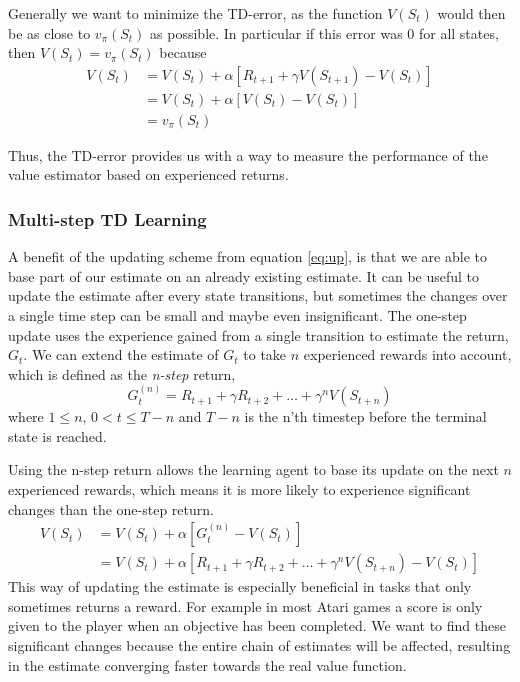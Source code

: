 \documentclass[11pt]{article}
\begin{document}
Generally we want to minimize the TD-error, as the function $V(S_t)$
would then be as close to $v_\pi(S_t)$ as possible.
In particular if this error was 0 for all states, then
$V(S_t) = v_\pi(S_t)$ because 
\begin{equation}
    \begin{aligned}
    V(S_t)  & = V(S_t) + \alpha  [R_{t+1} + \gamma  V(S_{t+1}) - V(S_t)]   \\
           & = V(S_t) + \alpha  [V(S_t) - V(S_t)]  \\
           & = v_\pi(S_t) 
    \end{aligned}
\end{equation}

Thus, the TD-error provides us with a way to measure the performance of
the value estimator based on experienced returns.

\subsubsection{Multi-step TD Learning}\label{sec:multi}

A benefit of the updating scheme from equation \ref{eq:up}, is that we are able to base
part of our estimate on an already existing estimate.
It can be useful to update the estimate after every state transitions, but sometimes
the changes over a single time step can be small and maybe even insignificant.
The one-step update uses the experience gained from a single transition to
estimate the return, $G_t$.
We can extend the estimate of $G_t$ to take $n$ experienced rewards
into account, which is defined as the \textit{n-step} return,
\begin{equation}
    G^{(n)}_t = R_{t+1} + \gamma R_{t+2} + \dots + \gamma^n V(S_{t+n})
\end{equation}
where $1 \leq n$, $0 < t \leq T - n$ and $T - n$ is the n'th timestep before the terminal state
is reached.

Using the n-step return allows the learning agent to base its update on the next $n$ experienced
rewards, which means it is more likely to experience significant changes than the one-step return.
\begin{equation}
    \begin{aligned}    
        V(S_t) & = V(S_t) + \alpha [G^{(n)}_t - V(S_t)]\\
        & = V(S_t) + \alpha [R_{t+1} + \gamma R_{t+2} + \dots + \gamma^n V(S_{t+n}) - V(S_t)]
    \end{aligned}
\end{equation}
This way of updating the estimate is especially beneficial in tasks that only sometimes returns a reward. 
For example in most Atari games a score is only given to the player when an objective has been completed.
We want to find these significant changes because the entire chain of estimates 
will be affected, resulting in the estimate converging faster towards the real value function.
\end{document}
